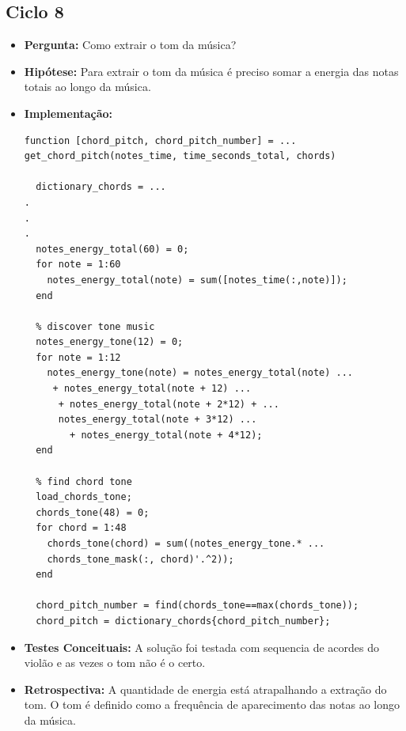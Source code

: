 \subsection{Ciclo 8}
\begin{itemize}
\item \textbf{Pergunta:} Como extrair o tom da música?
\item \textbf{Hipótese:} Para extrair o tom da música é preciso somar a energia das notas totais ao longo da música.
\item \textbf{Implementação:} 
\begin{lstlisting}
function [chord_pitch, chord_pitch_number] = ...
get_chord_pitch(notes_time, time_seconds_total, chords)
  
  dictionary_chords = ...
.
.
.
  notes_energy_total(60) = 0;
  for note = 1:60
    notes_energy_total(note) = sum([notes_time(:,note)]);
  end

  % discover tone music
  notes_energy_tone(12) = 0;
  for note = 1:12
    notes_energy_tone(note) = notes_energy_total(note) ...
     + notes_energy_total(note + 12) ...
      + notes_energy_total(note + 2*12) + ...
      notes_energy_total(note + 3*12) ...
        + notes_energy_total(note + 4*12);
  end

  % find chord tone
  load_chords_tone;
  chords_tone(48) = 0;
  for chord = 1:48
    chords_tone(chord) = sum((notes_energy_tone.* ...
    chords_tone_mask(:, chord)'.^2));
  end

  chord_pitch_number = find(chords_tone==max(chords_tone));
  chord_pitch = dictionary_chords{chord_pitch_number};
\end{lstlisting}
\item \textbf{Testes Conceituais:} A solução foi testada com sequencia de acordes do violão e as vezes o tom não é o certo.
\item \textbf{Retrospectiva:} A quantidade de energia está atrapalhando a extração do tom. O tom é definido como a frequência de aparecimento das notas ao longo da música.
\end{itemize}

